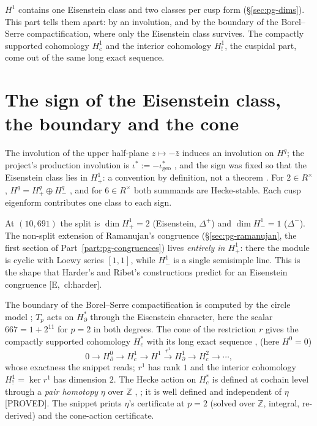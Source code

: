 \documentclass[11pt]{article}
\newcommand{\Z}{\mathbb{Z}}
\newcommand{\PROVED}{\textsf{\small[PROVED]}}
\begin{document}
$H^{1}$ contains one Eisenstein class and two classes per cusp form (\S\ref{sec:pg-dims}). This part tells them apart: by an involution,
and by the boundary of the Borel--Serre compactification, where only the Eisenstein class survives. The compactly supported cohomology
$H^{1}_{c}$ and the interior cohomology $H^{1}_{!}$, the cuspidal part, come out of the same long exact sequence.

\section{The sign of the Eisenstein class, the boundary and the cone}\label{sec:pg-sign}

The involution of the upper half-plane $z\mapsto-\bar z$ induces an involution on $H^{q}$; the project's production involution is
$\iota^{*}:=-\iota^{*}_{\mathrm{geo}}$ {}, and the sign was fixed so that the Eisenstein class lies in $H^{1}_{+}$:
a convention by definition, not a theorem {}. For $2\in R^{\times}$, $H^{q}=H^{q}_{+}\oplus H^{q}_{-}$
{}, and for $6\in R^{\times}$ both summands are Hecke-stable. Each cusp eigenform contributes one class to each
sign.

At $(10,691)$ the split is $\dim H^{1}_{+}=2$ (Eisenstein, $\Delta^{+}$) and $\dim H^{1}_{-}=1$ ($\Delta^{-}$). The non-split extension of Ramanujan's congruence
(\S\ref{sec:pg-ramanujan}, the first section of Part~\ref{part:pg-congruences}) lives \emph{entirely in $H^{1}_{+}$}: there the module is cyclic with Loewy series $[1,1]$, while $H^{1}_{-}$ is a
single semisimple line. This is the shape that Harder's and Ribet's constructions predict for an Eisenstein congruence
[E,~cl:harder].

The boundary of the Borel--Serre compactification is computed by the circle model {}; $T_p$ acts on $H^{*}_{\partial}$
through the Eisenstein character, here the scalar $667=1+2^{11}$ for $p=2$ in both degrees. The cone of the restriction $r$ gives the compactly
supported cohomology $H^{*}_{c}$ with its long exact sequence {}, {\ttfamily[C,~eq:coneles]}
(here $H^{0}=0$)
\[
  0\to H^{0}_{\partial}\to H^{1}_{c}\to H^{1}\xrightarrow{\,r^{1}\,}H^{1}_{\partial}\to H^{2}_{c}\to\cdots,
\]
whose exactness the snippet reads; $r^{1}$ has rank $1$ and the interior cohomology $H^{1}_{!}=\ker r^{1}$ has dimension $2$. The Hecke action on
$H^{*}_{c}$ is defined at cochain level through a \emph{pair homotopy} $\eta$ over $\Z$ {},
{}; it is well defined and independent of $\eta$ {} \PROVED. The snippet prints
$\eta$'s certificate at $p=2$ (solved over $\Z$, integral, re-derived) and the cone-action certificate.
\end{document}
